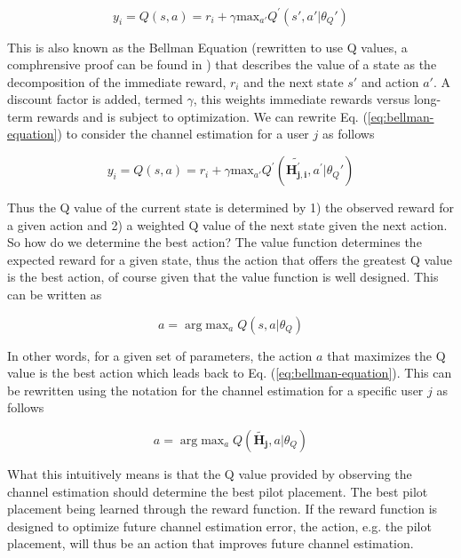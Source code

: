 \begin{equation}\label{eq:bellman-equation}
    y_i = Q(s, a) = r_i + \gamma \text{max}_{a'} Q^{'}(s', a' | \theta_Q')
\end{equation}

This is also known as the Bellman Equation (rewritten to use Q values, a comphrensive proof can be found in \cite{Sutton2017ReinforcementSecond}) that describes the value of a state as the decomposition of the immediate reward, $r_i$ and the next state $s'$ and action $a'$. A discount factor is added, termed $\gamma$, this weights immediate rewards versus long-term rewards and is subject to optimization. We can rewrite Eq. (\ref{eq:bellman-equation}) to consider the channel estimation for a user $j$  as follows

\begin{equation}\label{eq:value-function}
    y_i = Q(s, a) = r_i + \gamma \text{max}_{a'} Q^{'}(\mathbf{\widetilde{H_{j,i}^{'}}}, a^{'} | \theta_Q')
\end{equation}

Thus the Q value of the current state is determined by 1) the observed reward for a given action and 2) a weighted Q value of the next state given the next action. So how do we determine the best action? The value function determines the expected reward for a given state, thus the action that offers the greatest Q value is the best action, of course given that the value function is well designed. This can be written as

\begin{equation}\label{eq:critic-action}
    a = \arg \text{max}_{a} \; Q(s, a | \theta_Q)
\end{equation}

In other words, for a given set of parameters, the action $a$ that maximizes the Q value is the best action which leads back to Eq. (\ref{eq:bellman-equation}). This can be rewritten using the notation for the channel estimation for a specific user $j$ as follows

\begin{equation}\label{eq:critic-action}
    a = \arg \text{max}_{a} \; Q(\mathbf{\widetilde{H_{j}}}, a | \theta_Q)
\end{equation}

What this intuitively means is that the Q value provided by observing the channel estimation should determine the best pilot placement. The best pilot placement being learned through the reward function. If the reward function is designed to optimize future channel estimation error, the action, e.g. the pilot placement, will thus be an action that improves future channel estimation.

